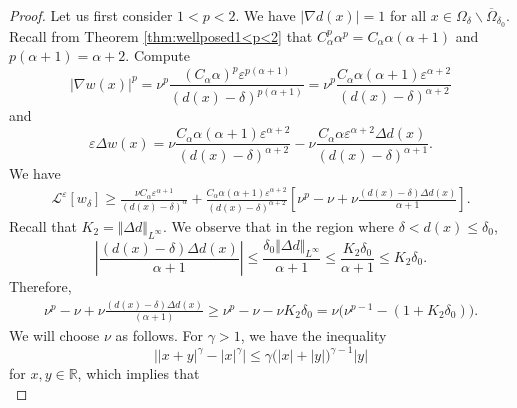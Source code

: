 \documentclass[11pt,reqno]{amsart}
\numberwithin{figure}{section}
\theoremstyle{plain}
\theoremstyle{remark}
\numberwithin{equation}{section}
\begin{document}
\begin{proof} Let us first consider $1<p<2$. We have $|\nabla d(x)| = 1$ for all $x\in \Omega_\delta\backslash \overline{\Omega}_{\delta_0}$. Recall from Theorem \ref{thm:wellposed1<p<2} that $C_\alpha^p \alpha^p = C_\alpha \alpha (\alpha+1)$ and $p(\alpha+1) = \alpha+2$. Compute 
\begin{equation*}
    |\nabla w(x)|^p = \nu^p\frac{(C_\alpha\alpha)^p\varepsilon^{p(\alpha+1)}}{(d(x)-\delta)^{p(\alpha+1)}} = \nu^p\frac{C_\alpha \alpha(\alpha+1)\varepsilon^{\alpha+2}}{(d(x)-\delta)^{\alpha+2}}
\end{equation*}
and
\begin{equation*}
    \varepsilon\Delta w(x) = \nu\frac{C_\alpha\alpha(\alpha+1)\varepsilon^{\alpha+2}}{(d(x)-\delta)^{\alpha+2}} - \nu\frac{C_\alpha\alpha\varepsilon^{\alpha+2}\Delta d(x)}{(d(x)-\delta)^{\alpha+1}}.
\end{equation*}
We have
\begin{equation*}
    \begin{split}
        \mathcal{L}^\varepsilon\left[w_\delta\right] \geq \frac{\nu C_\alpha\varepsilon^{\alpha+1}}{(d(x)-\delta)^\alpha} + \frac{C_\alpha \alpha (\alpha+1)\varepsilon^{\alpha+2}}{(d(x)-\delta)^{\alpha+2}}\left[\nu^p-\nu +\nu\frac{(d(x)-\delta)\Delta d(x)}{\alpha+1}\right].
    \end{split}
\end{equation*}
Recall that $K_2= \Vert \Delta d\Vert_{L^\infty}$. We observe that in the region where $\delta< d(x)\leq \delta_0$,
\begin{equation*}
    \left|\frac{(d(x)-\delta)\Delta d(x)}{\alpha+1}\right| \leq \frac{\delta_0\Vert \Delta d\Vert_{L^\infty}}{\alpha+1} \leq \frac{K_2\delta_0}{\alpha+1}\leq K_2\delta_0.
\end{equation*}
Therefore,
\begin{equation}\label{e:choose_nu}
    \begin{split}
        \nu^p-\nu +\nu\frac{(d(x)-\delta)\Delta d(x)}{(\alpha+1)} \geq \nu^p - \nu - \nu K_2\delta_0 = \nu\Big(\nu^{p-1} - (1+K_2\delta_0)\Big).
    \end{split}
\end{equation}
We will choose $\nu$ as follows. For $\gamma>1$, we have the inequality
\begin{equation}\label{e:ineq}
    \Big||x+y|^\gamma - |x|^\gamma\Big|\leq \gamma\Big(|x|+|y|\Big)^{\gamma-1}|y|
\end{equation}
for $x,y\in \mathbb{R}$, which implies that
\begin{equation*}

\end{equation*}
\end{proof}
\end{document}
